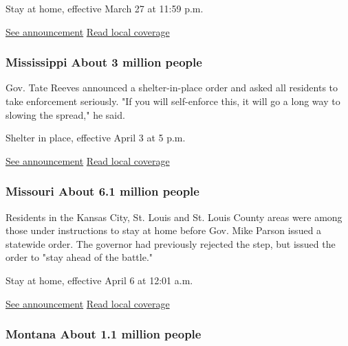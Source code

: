 Stay at home, effective March 27 at 11:59 p.m.

\href{https://mn.gov/governor/covid-19/}{See announcement} \textbar{}
\href{https://www.startribune.com/gov-tim-walz-to-order-new-covid-19-restrictions-on-minnesotans/569095212/}{Read
local coverage}

\hypertarget{mississippi-about-3-million-people}{%
\subsubsection{Mississippi About 3 million
people}\label{mississippi-about-3-million-people}}

Gov. Tate Reeves announced a shelter-in-place order and asked all
residents to take enforcement seriously. "If you will self-enforce this,
it will go a long way to slowing the spread," he said.

Shelter in place, effective April 3 at 5 p.m.

\href{https://yallpolitics.com/2020/04/01/mississippi-governor-tate-reeves-orders-statewide-shelter-at-home/unnamed-13-2/}{See
announcement} \textbar{}
\href{https://yallpolitics.com/2020/04/01/mississippi-governor-tate-reeves-orders-statewide-shelter-in-place/}{Read
local coverage}

\hypertarget{missouri-about-61-million-people}{%
\subsubsection{Missouri About 6.1 million
people}\label{missouri-about-61-million-people}}

Residents in the Kansas City, St. Louis and St. Louis County areas were
among those under instructions to stay at home before Gov. Mike Parson
issued a statewide order. The governor had previously rejected the step,
but issued the order to "stay ahead of the battle."

Stay at home, effective April 6 at 12:01 a.m.

\href{https://twitter.com/GovParsonMO/status/1246196795107160064?s=20}{See
announcement} \textbar{}
\href{https://www.kansascity.com/news/politics-government/article241743921.html}{Read
local coverage}

\hypertarget{montana-about-11-million-people}{%
\subsubsection{Montana About 1.1 million
people}\label{montana-about-11-million-people}}

